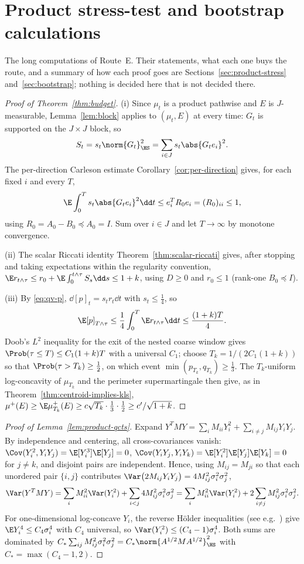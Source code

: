 \documentclass[../../main.tex]{subfiles}
\begin{document}
\section{Product stress-test and bootstrap calculations}
\label{sec:appendix-route-e}

The long computations of Route~E. Their statements, what each one buys the route, and a
summary of how each proof goes are Sections~\ref{sec:product-stress}
and~\ref{sec:bootstrap}; nothing is decided here that is not decided there.

\begin{proof}[Proof of Theorem~\ref{thm:budget}]
(i) Since $\mu_t$ is a product pathwise and $E$ is $J$-measurable, Lemma~\ref{lem:block}
applies to $(\mu_t,E)$ at every time: $G_t$ is supported on the $J\times J$ block, so
\[
  S_t=s_t\norm{G_t}_\HS^2=\sum_{i\in J}s_t\abs{G_te_i}^2 .
\]
The per-direction Carleson estimate Corollary~\ref{cor:per-direction} gives, for each fixed $i$
and every $T$,
\[
  \E\int_0^T s_t\abs{G_te_i}^2\dd t\le e_i^TR_0e_i=(R_0)_{ii}\le1,
\]
using $R_0=A_0-B_0\preceq A_0=I$. Sum over $i\in J$ and let $T\to\infty$ by monotone convergence.

(ii) The scalar Riccati identity Theorem~\ref{thm:scalar-riccati} gives, after stopping and taking
expectations within the regularity convention,
$\E r_{t\wedge\tau}\le r_0+\E\int_0^{t\wedge\tau}S_s\dd s\le1+k$, using $D\ge0$ and
$r_0\le1$ (rank-one $B_0\preceq I$).

(iii) By \eqref{eq:qv-p}, $\dd[p]_t=s_tr_t\dd t$ with $s_t\le\tfrac14$, so
\[
  \E[p]_{T\wedge\tau}\le\frac14\int_0^T\E r_{t\wedge\tau}\dd t\le\frac{(1+k)T}4 .
\]
Doob's $L^2$ inequality for the exit of the nested coarse window gives
$\Prob(\tau\le T)\le C_1(1+k)T$ with a universal $C_1$; choose $T_k=1/(2C_1(1+k))$ so that
$\Prob(\tau>T_k)\ge\tfrac12$, on which event $\min(p_{T_k},q_{T_k})\ge\tfrac13$. The
$T_k$-uniform log-concavity of $\mu_{T_k}$ and the perimeter supermartingale then give, as in
Theorem~\ref{thm:centroid-implies-kls},
$\mu^+(E)\ge\E\mu_{T_k}^+(E)\ge c\sqrt{T_k}\cdot\tfrac13\cdot\tfrac12\ge c'/\sqrt{1+k}$.
\end{proof}

\begin{proof}[Proof of Lemma~\ref{lem:product-qcts}]
Expand $Y^TMY=\sum_iM_{ii}Y_i^2+\sum_{i\ne j}M_{ij}Y_iY_j$. By independence and centering, all
cross-covariances vanish: $\Cov(Y_i^2,Y_iY_j)=\E[Y_i^3]\E[Y_j]=0$,
$\Cov(Y_iY_j,Y_iY_k)=\E[Y_i^2]\E[Y_j]\E[Y_k]=0$ for $j\ne k$, and disjoint pairs are
independent. Hence, using $M_{ij}=M_{ji}$ so that each unordered pair $\{i,j\}$ contributes
$\Var\bigl(2M_{ij}Y_iY_j\bigr)=4M_{ij}^2\sigma_i^2\sigma_j^2$,
\[
  \Var(Y^TMY)=\sum_iM_{ii}^2\Var(Y_i^2)
  +\sum_{i<j}4M_{ij}^2\sigma_i^2\sigma_j^2
  =\sum_iM_{ii}^2\Var(Y_i^2)+2\sum_{i\ne j}M_{ij}^2\sigma_i^2\sigma_j^2 .
\]
For one-dimensional log-concave $Y_i$, the reverse H\"older inequalities (see e.g.\
\cite[Cor.~5]{KLnotes}) give $\E Y_i^4\le C_4\sigma_i^4$ with $C_4$ universal, so
$\Var(Y_i^2)\le(C_4-1)\sigma_i^4$. Both sums are dominated by
$C_*\sum_{ij}M_{ij}^2\sigma_i^2\sigma_j^2=C_*\norm{A^{1/2}MA^{1/2}}_\HS^2$ with
$C_*=\max(C_4-1,2)$.
\end{proof}
\end{document}
